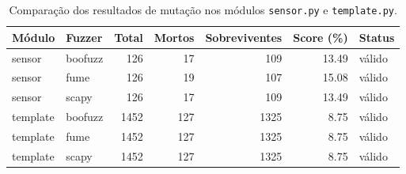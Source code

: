 \begin{table}[htbp]
\centering
\caption{Comparação dos resultados de mutação nos módulos \texttt{sensor.py} e \texttt{template.py}.}
\label{tab:comparacao_sensor_template}
\begin{tabular}{llrrrrl}
\hline
\textbf{Módulo} & \textbf{Fuzzer} & \textbf{Total} & \textbf{Mortos} & \textbf{Sobreviventes} & \textbf{Score (\%)} & \textbf{Status} \\
\hline
sensor & boofuzz & 126 & 17 & 109 & 13.49 & válido \\
sensor & fume & 126 & 19 & 107 & 15.08 & válido \\
sensor & scapy & 126 & 17 & 109 & 13.49 & válido \\
template & boofuzz & 1452 & 127 & 1325 & 8.75 & válido \\
template & fume & 1452 & 127 & 1325 & 8.75 & válido \\
template & scapy & 1452 & 127 & 1325 & 8.75 & válido \\
\hline
\end{tabular}
\end{table}
